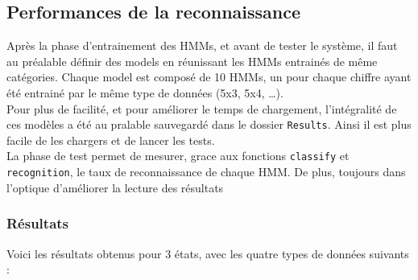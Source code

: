 \subsection{Performances de la reconnaissance}

Après la phase d'entrainement des HMMs, et avant de tester le système, il faut au préalable définir des models en réunissant les HMMs entrainés de même catégories. Chaque model est composé de 10 HMMs, un pour chaque chiffre ayant été entrainé par le même type de données (5x3, 5x4, \dots).\\

Pour plus de facilité, et pour améliorer le temps de chargement, l'intégralité de ces modèles a été au pralable sauvegardé dans le dossier \texttt{Results}. Ainsi il est plus facile de les chargers et de lancer les tests.\\

La phase de test permet de mesurer, grace aux fonctions \texttt{classify} et \texttt{recognition}, le taux de reconnaissance de chaque HMM. De plus, toujours dans l'optique d'améliorer la lecture des résultats

\subsubsection*{Résultats}
Voici les résultats obtenus pour 3 états, avec les quatre types de données suivants :
\newpage


